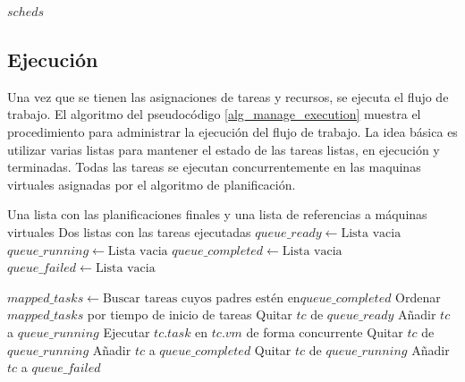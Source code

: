 \begin{algorithm}
\begin{algorithmic}[1]
    \State \Return $scheds$
\EndProcedure
\end{algorithmic}
\end{algorithm}


\subsection{Ejecución}

Una vez que se tienen las asignaciones de tareas y recursos, se ejecuta el flujo de trabajo. El algoritmo del pseudoc\'odigo \ref{alg_manage_execution} muestra el procedimiento para administrar la ejecuci\'on del flujo de trabajo. La idea b\'asica es utilizar varias listas para mantener el estado de las tareas listas, en ejecuci\'on y terminadas. Todas las tareas se ejecutan concurrentemente en las m\;aquinas virtuales asignadas por el algoritmo de planificaci\'on.

\begin{algorithm}
\caption{Ejecuci\'on de tareas en las m\'aquinas virtuales}
\label{alg_manage_execution}
\begin{algorithmic}
\Require Una lista con las planificaciones finales y una lista de referencias a m\'aquinas virtuales
\Ensure Dos listas con las tareas ejecutadas
    \State $queue\_ready \gets \text{Lista vacia}$
    \State $queue\_running \gets \text{Lista vacia}$
    \State $queue\_completed \gets \text{Lista vacia}$
    \State $queue\_failed \gets \text{Lista vacia}$

    \EndFor

        \State $mapped\_tasks \gets \text{Buscar tareas cuyos padres est\'en en} queue\_completed$
        \State Ordenar $mapped\_tasks$ por tiempo de inicio de tareas
            \State Quitar $tc$ de $queue\_ready$
            \State Añadir $tc$ a $queue\_running$
            \State Ejecutar $tc.task$ en $tc.vm$ de forma concurrente
        \EndFor
                \State Quitar $tc$ de $queue\_running$
                \State Añadir $tc$ a $queue\_completed$
                \State Quitar $tc$ de $queue\_running$
                \State Añadir $tc$ a $queue\_failed$
            \EndIf
        \EndFor
    \EndWhile
\EndProcedure
\end{algorithmic}
\end{algorithm}


